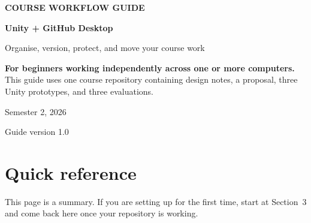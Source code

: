 \documentclass[11pt,a4paper]{article}
\begin{document}
\begin{titlepage}
\pagecolor{Ink}
\color{white}
\vspace*{42mm}
{\fontsize{14}{17}\selectfont\bfseries COURSE WORKFLOW GUIDE\par}
\vspace{7mm}
{\fontsize{34}{39}\selectfont\bfseries Unity + GitHub Desktop\par}
\vspace{5mm}
{\fontsize{17}{22}\selectfont Organise, version, protect, and move your course work\par}
\vspace{16mm}
\begin{tcolorbox}[colback=white!8!Ink,colframe=white!18!Ink,boxrule=.6pt,arc=2mm]
\color{white}
\textbf{For beginners working independently across one or more computers.}\\[2mm]
This guide uses one course repository containing design notes, a proposal, three Unity
prototypes, and three evaluations.
\end{tcolorbox}
\vfill
{\large Semester 2, 2026\par}
\vspace{4mm}
{\small\color{Rule}Guide version 1.0\par}
\end{titlepage}
\nopagecolor
\color{Ink}

\tableofcontents
\clearpage

\section{Quick reference}

This page is a summary. If you are setting up for the first time, start at Section~3 and
come back here once your repository is working.

\begin{keybox}
\vspace{1mm}
\centering
{}
\vspace{1mm}
\end{keybox}
\end{document}
